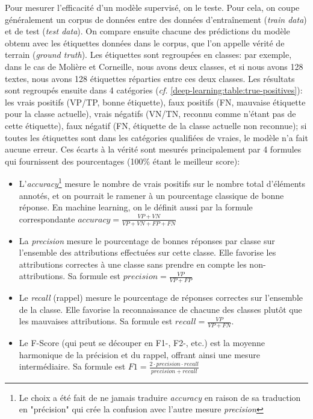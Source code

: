 Pour mesurer l'efficacité d'un modèle supervisé, on le teste. Pour cela, on coupe généralement un corpus de données entre des données d'entraînement (\textit{train data}) et de test (\textit{test data}). On compare ensuite chacune des prédictions du modèle obtenu avec les étiquettes données dans le corpus, que l'on appelle vérité de terrain (\textit{ground truth}). Les étiquettes sont regroupées en classes: par exemple, dans le cas de Molière et Corneille, nous avons deux classes, et si nous avons 128 textes, nous avons 128 étiquettes réparties entre ces deux classes. Les résultats sont regroupés ensuite dans 4 catégories (\textit{cf.} \ref{deep-learning:table:true-positives}): les vrais positifs (VP/TP, bonne étiquette), faux positifs (FN, mauvaise étiquette pour la classe actuelle), vrais négatifs (VN/TN, reconnu comme n'étant pas de cette étiquette), faux négatif (FN, étiquette de la classe actuelle non reconnue); si toutes les étiquettes sont dans les catégories qualifiées de vraies, le modèle n'a fait aucune erreur. Ces écarts à la vérité sont mesurés principalement par 4 formules qui fournissent des pourcentages (100\% étant le meilleur score):
\begin{itemize}
    \item L'\textit{accuracy}\footnote{Le choix a été fait de ne jamais traduire \textit{accuracy} en raison de sa traduction en "précision" qui crée la confusion avec l'autre mesure \textit{precision}} mesure le nombre de vrais positifs sur le nombre total d'éléments annotés, et on pourrait le ramener à un pourcentage classique de bonne réponse. En machine learning, on le définit aussi par la formule correspondante $accuracy = \frac{VP + VN}{VP + VN + FP + FN}$
    \item La \textit{precision} mesure le pourcentage de bonnes réponses par classe sur l'ensemble des attributions effectuées sur cette classe. Elle favorise les attributions correctes à une classe sans prendre en compte les non-attributions. Sa formule est $precision = \frac{VP}{VP + FP}$
    \item Le \textit{recall} (rappel) mesure le pourcentage de réponses correctes sur l'ensemble de la classe. Elle favorise la reconnaissance de chacune des classes plutôt que les mauvaises attributions. Sa formule est $recall = \frac{VP}{VP+FN}$.
    \item Le F-Score (qui peut se découper en F1-, F2-, etc.) est la moyenne harmonique de la précision et du rappel, offrant ainsi une mesure intermédiaire. Sa formule est $F1 = \frac{2 \cdot precision\cdot recall}{precision+ recall}$
\end{itemize}{}


